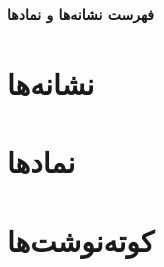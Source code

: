 \thispagestyle{empty}

{\noindent \bfseries \Huge
	فهرست نشانه‌ها و نمادها
}


\section*{نشانه‌ها}
\section*{نمادها}
\section*{کوته‌نوشت‌ها}



